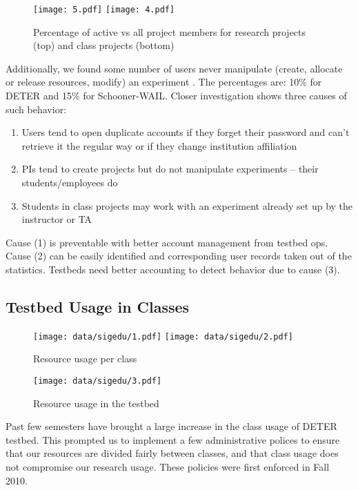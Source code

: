 \documentclass[12pt]{article}
\begin{document}
\begin{figure}[htbp]
\begin{center}
\texttt{[image: 5.pdf]}
\texttt{[image: 4.pdf]}
\caption{Percentage of active vs all project members for research projects 
 (top) and class projects (bottom)}
\label{active}
\end{center}
\end{figure}

Additionally, we found 
 some number of users never manipulate 
  (create, allocate or release resources, modify) an experiment .
The percentages are: 10\% for DETER and 15\% for Schooner-WAIL. 
Closer investigation shows three causes of such behavior:
\begin{enumerate}
\item Users tend to open duplicate accounts if they forget their password and 
 can't retrieve it the regular way or if they change institution affiliation
\item PIs tend to create projects but do not manipulate experiments -- their students/employees do
\item Students in class projects may work with an experiment already 
 set up by the instructor or TA
\end{enumerate}
Cause (1) is preventable with better account management from testbed ops. Cause (2) can be easily identified and corresponding user records taken out of the statistics. Testbeds need better accounting to detect behavior due to cause (3). 

\subsection*{Testbed Usage in Classes}
\begin{figure}[htbp]
\begin{center}
\texttt{[image: data/sigedu/1.pdf]}
\texttt{[image: data/sigedu/2.pdf]}
\caption{Resource usage per class}
\label{cluse}
\end{center}
\end{figure}

\begin{figure}[htbp]
\begin{center}
\texttt{[image: data/sigedu/3.pdf]}
\caption{Resource usage in the testbed}
\label{alluse}
\end{center}
\end{figure}

Past few semesters have brought a large increase in the class usage of
DETER testbed. This prompted us to implement a few administrative
polices to ensure that our resources are divided fairly between classes,
and that class usage does not compromise our research usage. These
policies were first enforced in Fall 2010.
\end{document}
